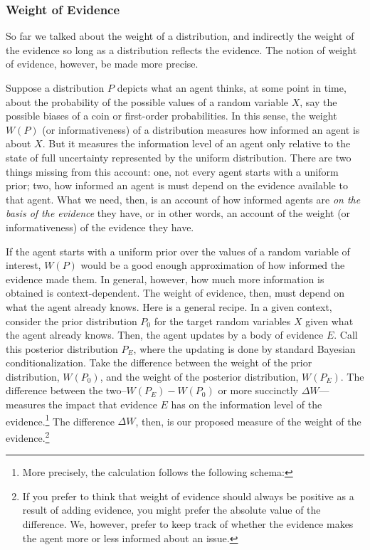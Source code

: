\documentclass[
  10pt,
  dvipsnames,enabledeprecatedfontcommands]{scrartcl}
\begin{document}
\hypertarget{weight-of-evidence-1}{%
\subsubsection{Weight of Evidence}\label{weight-of-evidence-1}}

So far we talked about the weight of a distribution, and indirectly the
weight of the evidence so long as a distribution reflects the evidence.
The notion of weight of evidence, however, be made more precise.

Suppose a distribution \(P\) depicts what an agent thinks, at some point
in time, about the probability of the possible values of a random
variable \(X\), say the possible biases of a coin or first-order
probabilities. In this sense, the weight \(W(P)\) (or informativeness)
of a distribution measures how informed an agent is about \(X\). But it
measures the information level of an agent only relative to the state of
full uncertainty represented by the uniform distribution. There are two
things missing from this account: one, not every agent starts with a
uniform prior; two, how informed an agent is must depend on the evidence
available to that agent. What we need, then, is an account of how
informed agents are \textit{on the basis of the evidence} they have, or
in other words, an account of the weight (or informativeness) of the
evidence they have.

If the agent starts with a uniform prior over the values of a random
variable of interest, \(W(P)\) would be a good enough approximation of
how informed the evidence made them. In general, however, how much more
information is obtained is context-dependent. The weight of evidence,
then, must depend on what the agent already knows. Here is a general
recipe. In a given context, consider the prior distribution \(P_0\) for
the target random variables \(X\) given what the agent already knows.
Then, the agent updates by a body of evidence \(E\). Call this posterior
distribution \(P_E\), where the updating is done by standard Bayesian
conditionalization. Take the difference between the weight of the prior
distribution, \(W(P_0)\), and the weight of the posterior distribution,
\(W(P_E)\). The difference between the two--\(W(P_E)-W(P_0)\) or more
succinctly \(\Delta W\)---measures the impact that evidence \(E\) has on
the information level of the evidence.\footnote{More precisely, the
  calculation follows the following schema:} The difference
\(\Delta W\), then, is our proposed measure of the weight of the
evidence.\footnote{If you prefer to think that weight of evidence should
  always be positive as a result of adding evidence, you might prefer
  the absolute value of the difference. We, however, prefer to keep
  track of whether the evidence makes the agent more or less informed
  about an issue.}
\end{document}
